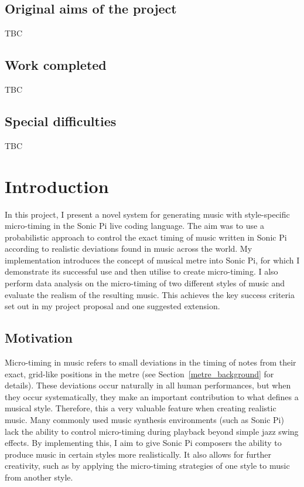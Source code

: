 \documentclass[12pt,twoside,openright]{report}
\begin{document}
\section*{Original aims of the project}

TBC

\section*{Work completed}

TBC

\section*{Special difficulties}

TBC
 
\newpage
\tableofcontents


\pagestyle{headings}





\chapter{Introduction} \label{introduction}

In this project, I present a novel system for generating music with
style-specific micro-timing in the Sonic Pi live coding language. The aim was to
use a probabilistic approach to control the exact timing of music written in
Sonic Pi according to realistic deviations found in music across the world. My
implementation introduces the concept of musical metre into Sonic Pi, for which
I demonstrate its successful use and then utilise to create micro-timing. I also
perform data analysis on the micro-timing of two different styles of music and
evaluate the realism of the resulting music. This achieves the key success
criteria set out in my project proposal and one suggested extension.



\section{Motivation} \label{motivation}

Micro-timing in music refers to small deviations in the timing of notes from
their exact, grid-like positions in the metre \cite{london2012} (see Section~\ref{metre_background} for details). These
deviations occur naturally in all human performances, but when they occur
systematically, they make an important contribution to what defines a musical
style. Therefore, this a very valuable feature when creating realistic music.
Many commonly used music synthesis environments (such as Sonic Pi) lack the
ability to control micro-timing during playback beyond simple jazz swing effects.
By implementing this, I aim to give Sonic Pi composers the ability to produce
music in certain styles more realistically. It also allows for further
creativity, such as by applying the micro-timing strategies of one style to
music from another style.
\end{document}
